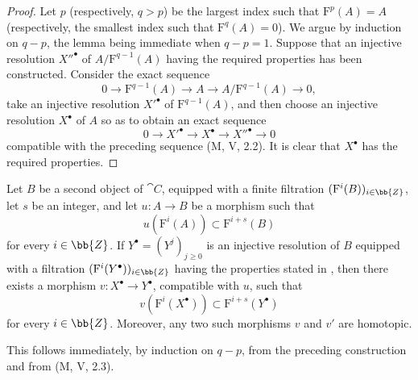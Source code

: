 \begin{proof}
Let $p$ (respectively, $q>p$) be the largest index such that
$\mathrm{F}^p(A)=A$ (respectively, the smallest index such that
$\mathrm{F}^q(A)=0$).
We argue by induction on $q-p$, the lemma being immediate when
$q-p=1$.
Suppose that an injective resolution ${X''}^\bullet$ of
$A/\mathrm{F}^{q-1}(A)$ having the required properties has been
constructed.
Consider the exact sequence
\[
  0\longrightarrow\mathrm{F}^{q-1}(A)
  \longrightarrow A
  \longrightarrow A/\mathrm{F}^{q-1}(A)
  \longrightarrow0,
\]
take an injective resolution ${X'}^\bullet$ of
$\mathrm{F}^{q-1}(A)$, and then choose an injective resolution
$X^\bullet$ of $A$ so as to obtain an exact sequence
\[
  0\longrightarrow {X'}^\bullet
  \longrightarrow X^\bullet
  \longrightarrow {X''}^\bullet
  \longrightarrow0
\]
compatible with the preceding sequence (M, V, 2.2).
It is clear that $X^\bullet$ has the required properties.
\end{proof}

\begin{corollary}[13.6.3]
\label{0.13.6.3}
Let $B$ be a second object of $\cat{C}$, equipped with a finite
filtration $(\mathrm{F}^i(B))_{i\in\bb{Z}}$, let $s$ be an integer,
and let $u:A\longrightarrow B$ be a morphism such that
\[
  u(\mathrm{F}^i(A))\subset\mathrm{F}^{i+s}(B)
\]
for every $i\in\bb{Z}$.
If $Y^\bullet=(Y^j)_{j\geq0}$ is an injective resolution of $B$
equipped with a filtration
$(\mathrm{F}^i(Y^\bullet))_{i\in\bb{Z}}$ having the properties stated
in , then there exists a morphism
$v:X^\bullet\longrightarrow Y^\bullet$, compatible with $u$, such
that
\[
  v(\mathrm{F}^i(X^\bullet))
  \subset
  \mathrm{F}^{i+s}(Y^\bullet)
\]
for every $i\in\bb{Z}$.
Moreover, any two such morphisms $v$ and $v'$ are homotopic.
\end{corollary}

This follows immediately, by induction on $q-p$, from the preceding
construction and from (M, V, 2.3).


